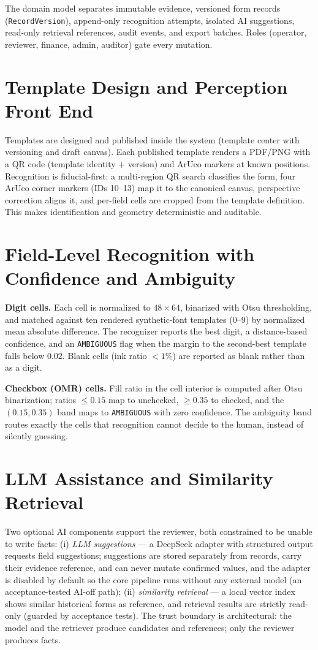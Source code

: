 \documentclass[conference]{IEEEtran}
\begin{document}
The domain model separates immutable evidence, versioned form records (\texttt{RecordVersion}), append-only recognition attempts, isolated AI suggestions, read-only retrieval references, audit events, and export batches. Roles (operator, reviewer, finance, admin, auditor) gate every mutation.

\section{Template Design and Perception Front End}
Templates are designed and published inside the system (template center with versioning and draft canvas). Each published template renders a PDF/PNG with a QR code (template identity + version) and ArUco markers at known positions. Recognition is fiducial-first: a multi-region QR search classifies the form, four ArUco corner markers (IDs 10--13) map it to the canonical canvas, perspective correction aligns it, and per-field cells are cropped from the template definition. This makes identification and geometry deterministic and auditable.

\section{Field-Level Recognition with Confidence and Ambiguity}
\textbf{Digit cells.} Each cell is normalized to $48{\times}64$, binarized with Otsu thresholding, and matched against ten rendered synthetic-font templates (0--9) by normalized mean absolute difference. The recognizer reports the best digit, a distance-based confidence, and an \texttt{AMBIGUOUS} flag when the margin to the second-best template falls below $0.02$. Blank cells (ink ratio $<1\%$) are reported as blank rather than as a digit.

\textbf{Checkbox (OMR) cells.} Fill ratio in the cell interior is computed after Otsu binarization; ratios $\leq 0.15$ map to unchecked, $\geq 0.35$ to checked, and the $(0.15,0.35)$ band maps to \texttt{AMBIGUOUS} with zero confidence. The ambiguity band routes exactly the cells that recognition cannot decide to the human, instead of silently guessing.

\section{LLM Assistance and Similarity Retrieval}
Two optional AI components support the reviewer, both constrained to be unable to write facts: (i) \emph{LLM suggestions} --- a DeepSeek adapter with structured output requests field suggestions; suggestions are stored separately from records, carry their evidence reference, and can never mutate confirmed values, and the adapter is disabled by default so the core pipeline runs without any external model (an acceptance-tested AI-off path); (ii) \emph{similarity retrieval} --- a local vector index shows similar historical forms as reference, and retrieval results are strictly read-only (guarded by acceptance tests). The trust boundary is architectural: the model and the retriever produce candidates and references; only the reviewer produces facts.
\end{document}
